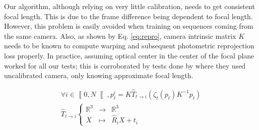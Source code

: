 \documentclass[runningheads]{llncs}
\begin{document}
Our algorithm, although relying on very little calibration, needs to get consistent focal length. This is due to the frame difference being dependent to focal length. However, this problem is easily avoided when training on sequences coming from the same camera. Also, as shown by Eq. \ref{eq:repro}, camera
intrinsic matrix $K$ needs
to be known to compute warping and subsequent photometric reprojection loss properly. In practice, assuming optical center in the center of the focal plane worked for all our tests; this is corroborated by tests done by \cite{Mahjourian} where they used uncalibrated camera, only knowing approximate focal length.

\begin{equation}
\label{eq:repro}
\begin{array}{c}
\forall i \in \left\llbracket0,N\right\llbracket,p^i_t=K\widehat{T}_{t \rightarrow i}\left(\zeta_t(p_t)K^{-1}p_t\right) \\
\widehat{T}_{t \rightarrow i} \left\lbrace
\begin{array}{lll}\mathbb{R}^3 & \rightarrow & \mathbb{R}^3 \\
X & \mapsto & \widehat{R}_{i}X + t_{i}
\end{array}\right.
\end{array}
\end{equation}
\end{document}
